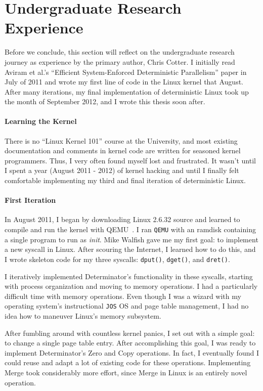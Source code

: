 
\section{Undergraduate Research Experience}
Before we conclude, this section will reflect on the undergraduate research
journey as experience by the primary author, Chris Cotter. I initially read
Aviram et al.'s ``Efficient System-Enforced Deterministic Parallelism'' paper
in July of 2011 and wrote my first line of code in the Linux kernel that August.
After many iterations, my final implementation of deterministic Linux took up
the month of September 2012, and I wrote this thesis soon after.

\paragraph{Learning the Kernel}
There is no ``Linux Kernel 101'' course at the University, and most existing
documentation and comments in kernel code are written for seasoned kernel
programmers. Thus, I very often found myself lost and frustrated. It wasn't
until I spent a year (August 2011 - 2012) of kernel hacking and until I finally
felt comfortable implementing my third and final iteration of deterministic
Linux.

\paragraph{First Iteration}
In August 2011, I began by downloading Linux 2.6.32 source and learned to
compile and run the kernel with {\qq QEMU}~\cite{bellard2007qemu}. I ran
{\tt QEMU} with an ramdisk containing a single program to run as \emph{init}.
Mike Walfish gave me my first goal: to implement a new syscall
in Linux. After scouring the Internet, I learned how to do this, and I wrote
skeleton code for my three syscalls: {\tt dput()}, {\tt dget()}, and
{\tt dret()}.

I iteratively implemented Determinator's functionality in these syscalls,
starting with process organization and moving to memory operations. I had a
particularly difficult time with memory operations. Even though I was a wizard
with my operating system's instructional {\tt JOS} OS and page table management,
I had no idea how to maneuver Linux's memory subsystem.

After fumbling around with countless kernel panics, I set out with a simple
goal: to change a single page table entry. After accomplishing this goal,
I was ready to implement Determinator's Zero and Copy operations. In fact, I
eventually found I could reuse and adapt a lot of existing code for these
operations. Implementing Merge took considerably more effort, since Merge in
Linux is an entirely novel operation.

